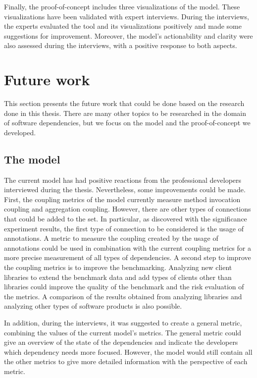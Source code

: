Finally, the proof-of-concept includes three visualizations of the model. These visualizations have been validated with expert interviews. During the interviews, the experts evaluated the tool and its visualizations positively and made some suggestions for improvement. Moreover, the model's actionability and clarity were also assessed during the interviews, with a positive response to both aspects.

\section{Future work} \label{sec:future_work}
This section presents the future work that could be done based on the research done in this thesis. There are many other topics to be researched in the domain of software dependencies, but we focus on the model and the proof-of-concept we developed.

\subsection{The model}

The current model has had positive reactions from the professional developers interviewed during the thesis. Nevertheless, some improvements could be made. First, the coupling metrics of the model currently measure method invocation coupling and aggregation coupling. However, there are other types of connections that could be added to the set. In particular, as discovered with the significance experiment results, the first type of connection to be considered is the usage of annotations. A metric to measure the coupling created by the usage of annotations could be used in combination with the current coupling metrics for a more precise measurement of all types of dependencies. A second step to improve the coupling metrics is to improve the benchmarking. Analyzing new client libraries to extend the benchmark data and add types of clients other than libraries could improve the quality of the benchmark and the risk evaluation of the metrics. A comparison of the results obtained from analyzing libraries and analyzing other types of software products is also possible.

In addition, during the interviews, it was suggested to create a general metric, combining the values of the current model's metrics. The general metric could give an overview of the state of the dependencies and indicate the developers which dependency needs more focused. However, the model would still contain all the other metrics to give more detailed information with the perspective of each metric.

